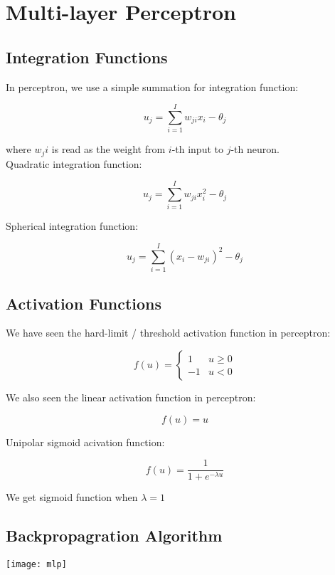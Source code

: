 \chapter{Multi-layer Perceptron}

\begin{multicols}{2}

\section{Integration Functions}

\noindent In perceptron, we use a simple summation for integration function:

$$u_j = \sum_{i=1}^I w_{ji}x_i - \theta_j$$

\noindent where $w_ji$ is read as the weight from $i$-th input to $j$-th neuron. \\

\noindent Quadratic integration function:

$$u_j = \sum_{i=1}^I w_{ji}x_i^2 - \theta_j$$

\noindent Spherical integration function:

$$u_j = \sum_{i=1}^I ( x_i - w_{ji})^2 - \theta_j$$

\section{Activation Functions}

\noindent We have seen the hard-limit / threshold activation function in perceptron:

$$
f(u) = 
\begin{cases}
1 & u \ge 0\\
-1 & u < 0
\end{cases}
$$

\noindent We also seen the linear activation function in perceptron:

$$f(u) = u$$

\noindent Unipolar sigmoid acivation function:

$$f(u) = \frac{1}{1+e^{-\lambda u}}$$

\noindent We get sigmoid function when $\lambda=1$

\section{Backpropagration Algorithm}

\begin{center}
\texttt{[image: mlp]}
\end{center}


\end{multicols}

